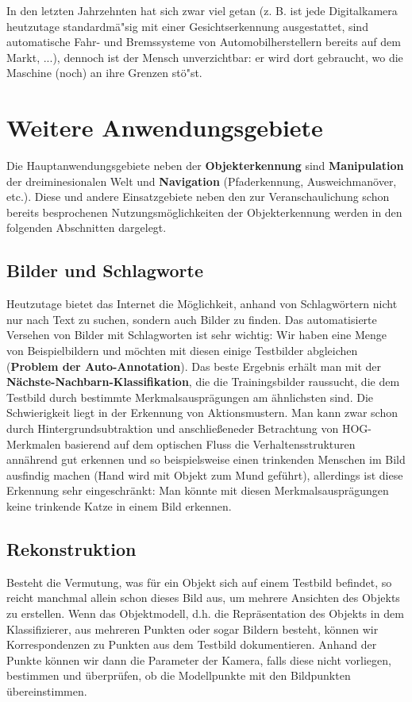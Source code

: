 In den letzten Jahrzehnten hat sich zwar viel getan (z. B. ist jede Digitalkamera heutzutage standardmä"sig mit einer Gesichtserkennung ausgestattet, sind automatische Fahr- und Bremssysteme von Automobilherstellern bereits auf dem Markt, ...), dennoch ist der Mensch unverzichtbar: er wird dort gebraucht, wo die Maschine (noch) an ihre Grenzen stö"st.

\section{Weitere Anwendungsgebiete}
Die Hauptanwendungsgebiete neben der \textbf{Objekterkennung} sind \textbf{Manipulation} der dreiminesionalen Welt und \textbf{Navigation} (Pfaderkennung, Ausweichmanöver, etc.). Diese und andere Einsatzgebiete neben den zur Veranschaulichung schon bereits besprochenen Nutzungsmöglichkeiten der Objekterkennung werden in den folgenden Abschnitten dargelegt.


\subsection{Bilder und Schlagworte}
Heutzutage bietet das Internet die Möglichkeit, anhand von Schlagwörtern nicht nur nach Text zu suchen, sondern auch Bilder zu finden. Das automatisierte Versehen von Bilder mit Schlagworten ist sehr wichtig: Wir haben eine Menge von Beispielbildern und möchten mit diesen einige Testbilder abgleichen (\textbf{Problem der Auto-Annotation}). Das beste Ergebnis erhält man mit der \textbf{Nächste-Nachbarn-Klassifikation}, die die Trainingsbilder raussucht, die dem Testbild durch bestimmte Merkmalsausprägungen am ähnlichsten sind. Die Schwierigkeit liegt in der Erkennung von Aktionsmustern. Man kann zwar schon durch Hintergrundsubtraktion und anschließeneder Betrachtung von HOG-Merkmalen basierend auf dem optischen Fluss die Verhaltensstrukturen annährend gut erkennen und so beispielsweise einen trinkenden Menschen im Bild ausfindig machen (Hand wird mit Objekt zum Mund geführt), allerdings ist diese Erkennung sehr eingeschränkt: Man könnte mit diesen Merkmalsausprägungen keine trinkende Katze in einem Bild erkennen.


\subsection{Rekonstruktion}
Besteht die Vermutung, was für ein Objekt sich auf einem Testbild befindet, so reicht manchmal allein schon dieses Bild aus, um mehrere Ansichten des Objekts zu erstellen. Wenn das Objektmodell, d.h. die Repräsentation des Objekts in dem Klassifizierer, aus mehreren Punkten oder sogar Bildern besteht, können wir Korrespondenzen zu Punkten aus dem Testbild dokumentieren. Anhand der Punkte können wir dann die Parameter der Kamera, falls diese nicht vorliegen, bestimmen und überprüfen, ob die Modellpunkte mit den Bildpunkten übereinstimmen.


